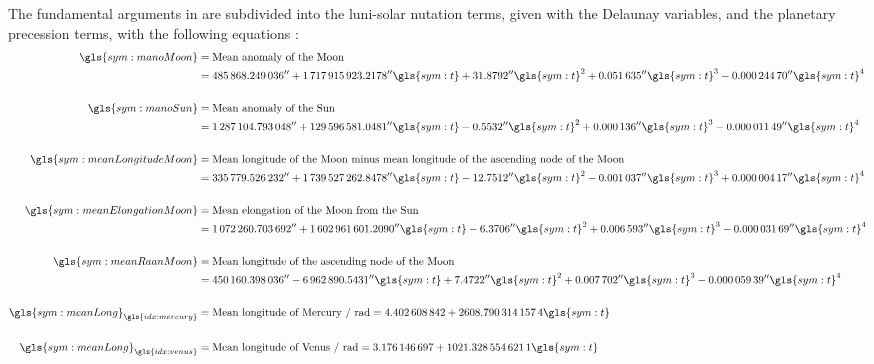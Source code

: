 The fundamental arguments in  are subdivided into the luni-solar nutation terms, given with the Delaunay variables, and the planetary precession terms, with the 
following equations \citep{luzum2010}:
\begin{align}
 \gls{sym:manoMoon} &= \text{Mean anomaly of the Moon} \\
		    &= \ang{;;485868.249036} + \ang{;;1717915923.2178}\gls{sym:t} + \ang{;;31.8792}\gls{sym:t}^2 + \ang{;;0.051635}\gls{sym:t}^3 - \ang{;;0.00024470}\gls{sym:t}^4  \notag \\
		    \notag \\
 \gls{sym:manoSun}  &=\text{Mean anomaly of the Sun} \\
	      	    &= \ang{;;1287104.793048} + \ang{;;129596581.0481}\gls{sym:t} - \ang{;;0.5532}\gls{sym:t}^2 + \ang{;;0.000136}\gls{sym:t}^3 - \ang{;;0.00001149}\gls{sym:t}^4 \notag \\
		    \notag \\
 \gls{sym:meanLongitudeMoon} &= \text{Mean longitude of the Moon minus mean longitude of the ascending node of the Moon} \\
			     &= \ang{;;335779.526232} + \ang{;;1739527262.8478}\gls{sym:t} - \ang{;;12.7512}\gls{sym:t}^2 - \ang{;;0.001037}\gls{sym:t}^3 + \ang{;;0.00000417}\gls{sym:t}^4 \notag \\
		    \notag \\
  \gls{sym:meanElongationMoon} &= \text{Mean elongation of the Moon from the Sun} \\
			       &= \ang{;;1072260.703692} + \ang{;;1602961601.2090}\gls{sym:t} - \ang{;;6.3706}\gls{sym:t}^2 + \ang{;;0.006593}\gls{sym:t}^3 - \ang{;;0.00003169}\gls{sym:t}^4 \notag \\
		    \notag \\
  \gls{sym:meanRaanMoon} &= \text{Mean longitude of the ascending node of the Moon} \\
			 &= \ang{;;450160.398036} - \ang{;;6962890.5431}\gls{sym:t} + \ang{;;7.4722}\gls{sym:t}^2 + \ang{;;0.007702}\gls{sym:t}^3 - \ang{;;0.00005939}\gls{sym:t}^4 \notag \\
                    \notag \\
  \gls{sym:meanLong}_{\gls{idx:mercury}} &= \text{Mean longitude of Mercury / rad} = \num{4.402608842} + \num{2608.7903141574}\gls{sym:t}   \\
                    \notag  \\
  \gls{sym:meanLong}_{\gls{idx:venus}}   &= \text{Mean longitude of Venus / rad} = \num{3.176146697} + \num{1021.3285546211}\gls{sym:t}   \\

\end{align}
